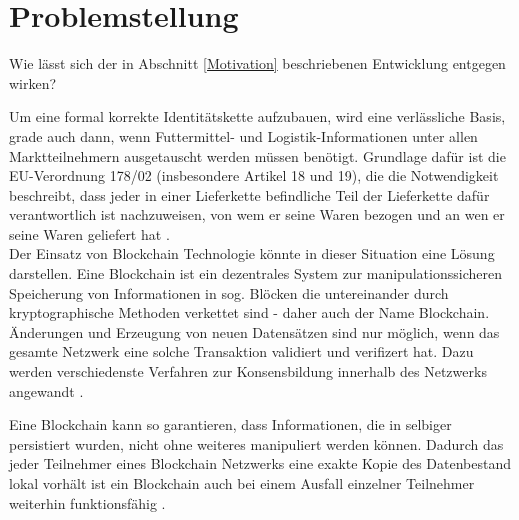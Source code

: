 \section{Problemstellung}

Wie lässt sich der in Abschnitt \ref{Motivation} beschriebenen Entwicklung entgegen wirken?

Um eine formal korrekte Identitätskette aufzubauen, wird eine verlässliche Basis, grade auch dann, wenn Futtermittel- und Logistik-Informationen unter allen Marktteilnehmern ausgetauscht werden müssen benötigt. Grundlage dafür ist die EU-Verordnung 178/02 (insbesondere Artikel 18 und 19), die die Notwendigkeit beschreibt, dass jeder in einer Lieferkette befindliche Teil der Lieferkette dafür verantwortlich ist nachzuweisen, von wem er seine Waren bezogen und an wen er seine Waren geliefert hat \citep{EPER2002}.\\

Der Einsatz von Blockchain Technologie könnte in dieser Situation eine Lösung darstellen. Eine Blockchain ist ein dezentrales System zur manipulationssicheren Speicherung von Informationen in sog. Blöcken die untereinander durch kryptographische Methoden verkettet sind - daher auch der Name Blockchain. Änderungen und Erzeugung von neuen Datensätzen sind nur möglich, wenn das gesamte Netzwerk eine solche Transaktion validiert und verifizert hat. Dazu werden verschiedenste Verfahren zur Konsensbildung innerhalb des Netzwerks angewandt \citep[siehe auch][]{Nakamoto2009, Buterin2014, Cardano2017, carVertical}.

Eine Blockchain kann so garantieren, dass Informationen, die in selbiger persistiert wurden, nicht ohne weiteres manipuliert werden können. Dadurch das jeder Teilnehmer eines Blockchain Netzwerks eine exakte Kopie des Datenbestand lokal vorhält ist ein Blockchain auch bei einem Ausfall einzelner Teilnehmer weiterhin funktionsfähig \citep{Drescher2017, Tribis2018}.


